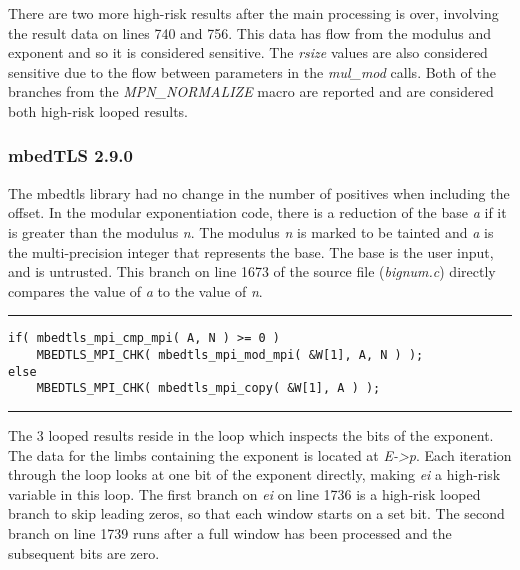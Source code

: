 \documentclass[11pt,a4paper]{article}
\newcommand{\codevar}[1]{\textit{#1}}
\newcommand{\codefn}[1]{\textit{#1}}
\newcommand{\codefile}[1]{\textit{#1}}
\newcommand{\ruleabove}{\vspace{5pt}\hrule}
\newcommand{\rulebelow}{\hrule\vspace{5pt}}
\begin{document}
There are two more high-risk results after the main processing is over,
involving the result data on lines 740 and 756. This data has flow from the
modulus and exponent and so it is considered sensitive. The \codevar{rsize} values are
also considered sensitive due to the flow between parameters in the
\codefn{mul\_mod} calls. Both of the branches from the \codefn{MPN\_NORMALIZE}
macro are reported and are considered both high-risk looped results.

\subsubsection{mbedTLS 2.9.0}

The mbedtls library had no change in the number of positives when including the
offset. In the modular exponentiation code, there is a reduction of the base \codevar{a}
if it is greater than the modulus \codevar{n}. The modulus \codevar{n} is marked to be tainted
and \codevar{a} is the multi-precision integer that represents the base. The base is the
user input, and is untrusted. This branch on line 1673 of the source file (\codefile{bignum.c})
directly compares the value of \codevar{a} to the value of \codevar{n}.

\ruleabove
\begin{lstlisting}[caption=mbed TLS 2.9.0 - bignum.c lines 1673-1676]
if( mbedtls_mpi_cmp_mpi( A, N ) >= 0 )
    MBEDTLS_MPI_CHK( mbedtls_mpi_mod_mpi( &W[1], A, N ) );
else
    MBEDTLS_MPI_CHK( mbedtls_mpi_copy( &W[1], A ) );
\end{lstlisting}
\rulebelow

The 3 looped results reside in the loop which inspects the bits of the exponent.
The data for the limbs containing the exponent is located at \codevar{E->p}. Each
iteration through the loop looks at one bit of the exponent directly, making
\codevar{ei} a high-risk variable in this loop. The first branch on \codevar{ei} on line 1736 is
a high-risk looped branch to skip leading zeros, so that each window starts on a
set bit. The second branch on line 1739 runs after a full window has been
processed and the subsequent bits are zero.
\end{document}
